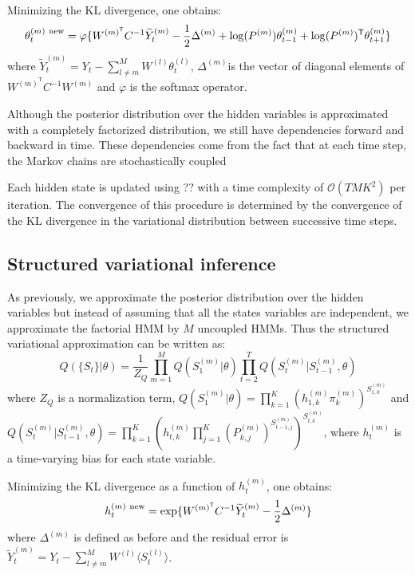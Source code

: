 \documentclass{article}
\begin{document}
Minimizing the KL divergence, one obtains:
\begin{equation}
\theta_t^{(m) \ \textnormal{new}} = \varphi\{ W^{(m)^\mathsf{T}} C^{-1} \widetilde{Y}_t^{(m)} - \frac{1}{2} \Delta^{(m)} + \log(P^{(m)}) \theta_{t-1}^{(m)} + \log(P^{(m)})^\mathsf{T} \theta_{t+1}^{(m)} \}
\end{equation}
where $\widetilde{Y}_t^{(m)} = Y_t - \sum_{l \ne m}^M W^{(l)} \theta_t^{(l)}$, $\Delta^{(m)}$is the vector of diagonal elements of $W^{(m)^\mathsf{T}} C^{-1} W^{(m)}$ and $\varphi$ is the softmax operator.

Although the posterior distribution over the hidden variables is approximated with a completely factorized distribution, we still have dependencies forward and backward in time. These dependencies come from the fact that at each time step, the Markov chains are stochastically coupled

Each hidden state is updated using ?? with a time complexity of $\mathcal{O}(T M K^2)$ per iteration. The convergence of this procedure is determined by the convergence of the KL divergence in the variational distribution between successive time steps.

\subsection{Structured variational inference}

As previously, we approximate the posterior distribution over the hidden variables but instead of assuming that all the states variables are independent, we approximate the factorial HMM by $M$ uncoupled HMMs. Thus the structured variational approximation can be written as:
\[ Q(\{ S_t \}| \theta) = \frac{1}{Z_Q} \prod_{m=1}^M Q( S_1^{(m)} | \theta) \prod_{t=2}^T Q(S_t^{(m)} | S_{t-1}^{(m)}, \theta) \]
where $Z_Q$ is a normalization term, $Q( S_1^{(m)} | \theta)= \prod_{k=1}^K \left( h_{1,k}^{(m)} \pi_k^{(m)} \right)^{S_{1,k}^{(m)}}$ and $Q(S_t^{(m)} | S_{t-1}^{(m)}, \theta)= \prod_{k=1}^K \left( h_{t,k}^{(m)} \prod_{j=1}^K (P_{k,j}^{(m)})^{S_{t-1,j}^{(m)}} \right)^{S_{t,k}^{(m)}}$, where $h_t^{(m)}$ is a time-varying bias for each state variable.

Minimizing the KL divergence as a function of $h_t^{(m)}$, one obtains:
\begin{equation}
h_t^{(m) \ \textnormal{new}} = \exp\{ W^{(m)^\mathsf{T}} C^{-1} \widetilde{Y}_t^{(m)} - \frac{1}{2} \Delta^{(m)} \}
\end{equation}
where $\Delta^{(m)}$ is defined as before and the residual error is $\widetilde{Y}_t^{(m)} = Y_t - \sum_{l \ne m}^M W^{(l)} \langle S_t^{(l)} \rangle$.
\end{document}
